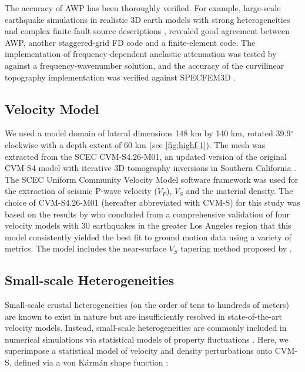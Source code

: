 The accuracy of AWP has been thoroughly verified. For example, large-scale earthquake simulations in realistic 3D earth models with strong heterogeneities and complex finite-fault source descriptions \citep{bielakShakeOutEarthquakeScenario2010,bielak2016verification}, revealed good agreement between AWP, another staggered-grid FD code and a finite-element code. 
The implementation of frequency-dependent anelastic attenuation was tested by \citet{withersMemoryEfficientSimulation2015} against a frequency-wavenumber solution, and the accuracy of the curvilinear topography implementation \citep{oreillyHighorderFiniteDifference2021} was verified against SPECFEM3D \citep{komatitschSpectralelementSimulationsGlobal2002}.


\subsection{Velocity Model}
We used a model domain of lateral dimensions 148 km by 140 km, rotated 39.9$^{\circ}$ clockwise with a depth extent of 60 km (see \cref{fig:highf-1}). The mesh was extracted from the SCEC CVM-S4.26-M01, an updated version of the original CVM-S4 model \citep{magistraleSCECSouthernCalifornia2000,kohlerMantleHeterogeneitiesSCEC2003} with iterative 3D tomography inversions in Southern California \citep{leeRapidFullwaveCentroid2011}. The SCEC Uniform Community Velocity Model software framework \citep[V19.4; ][]{smallSCECUnifiedCommunity2017} was used for the extraction of seismic P-wave velocity ($V_P$), $V_S$ and the material density. The choice of CVM-S4.26-M01 (hereafter abbreviated with CVM-S) for this study was based on the results by \citet{tabordaEvaluationSouthernCalifornia2016} who concluded from a comprehensive validation of four velocity models with 30 earthquakes in the greater Los Angeles region that this model consistently yielded the best fit to ground motion data using a variety of metrics. The model includes the near-surface $V_S$ tapering method proposed by \citet{huCalibrationNearsurfaceSeismic2021}.

\subsection{Small-scale Heterogeneities}
Small-scale crustal heterogeneities (on the order of tens to hundreds of meters) are known to exist in nature  but are insufficiently resolved in state-of-the-art velocity models. Instead, small-scale heterogeneities are commonly included in numerical simulations via statistical models of property fluctuations . Here, we superimpose a statistical model of velocity and density perturbations onto CVM-S, defined via a von K\'arm\'an shape function \citep{frankelFiniteDifferenceSimulations1986}:

